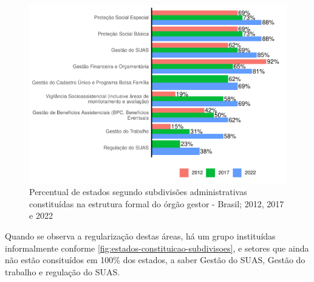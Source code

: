 \documentclass[
  brazilian]{report}
\begin{document}
\begin{figure}
\includegraphics{Censo-SUAS-2022_files/figure-latex/uf_subd-1} \caption[Percentual de estados segundo subdivisões administrativas constituídas na estrutura formal do órgão gestor - Brasil]{Percentual de estados segundo subdivisões administrativas constituídas na estrutura formal do órgão gestor - Brasil; 2012, 2017 e 2022}\label{fig:uf_subd}
\end{figure}

Quando se observa a regularização destas áreas, há um grupo instituídas
informalmente conforme \cref{fig:estados-constituicao-subdivisoes}, e
setores que ainda não estão consituídos em 100\% dos estados, a saber
Gestão do SUAS, Gestão do trabalho e regulação do SUAS.
\end{document}
